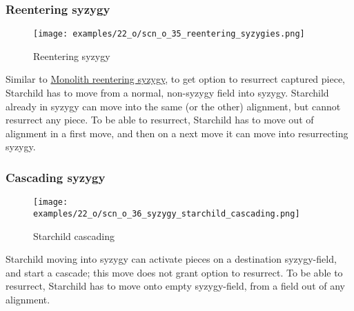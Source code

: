 \clearpage %

\subsubsection*{Reentering syzygy}
\label{sec:One/Starchild/Syzygy/Reentering syzygy}

\vspace*{-1.2\baselineskip}
\noindent
\begin{figure}[!h]
\texttt{[image: examples/22\_o/scn\_o\_35\_reentering\_syzygies.png]}
\caption{Reentering syzygy}
\label{fig:scn_o_35_reentering_syzygies}
\end{figure}

Similar to
\hyperref[fig:scn_d_23_syzygy_reentering_same_move]{Monolith reentering syzygy},
to get option to resurrect captured piece, Starchild has to move from a normal,
non-syzygy field into syzygy. Starchild already in syzygy can move into the same
(or the other) alignment, but cannot resurrect any piece. To be able to resurrect,
Starchild has to move out of alignment in a first move, and then on a next move
it can move into resurrecting syzygy.

\clearpage %

\subsubsection*{Cascading syzygy}
\label{sec:One/Starchild/Syzygy/Cascading syzygy}

\vspace*{-1.2\baselineskip}
\noindent
\begin{figure}[!h]
\texttt{[image: examples/22\_o/scn\_o\_36\_syzygy\_starchild\_cascading.png]}
\caption{Starchild cascading}
\label{fig:scn_o_36_syzygy_starchild_cascading}
\end{figure}

Starchild moving into syzygy can activate pieces on a destination syzygy-field,
and start a cascade; this move does not grant option to resurrect. To be able to
resurrect, Starchild has to move onto empty syzygy-field, from a field out of
any alignment.

